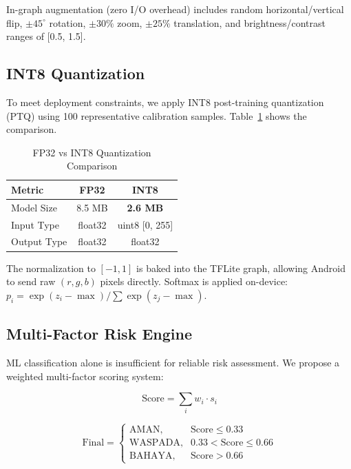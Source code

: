 \documentclass[conference]{IEEEtran}
\begin{document}
In-graph augmentation (zero I/O overhead) includes random horizontal/vertical flip, $\pm45^\circ$ rotation, $\pm30\%$ zoom, $\pm25\%$ translation, and brightness/contrast ranges of [0.5, 1.5].

\subsection{INT8 Quantization}

To meet deployment constraints, we apply INT8 post-training quantization (PTQ) using 100 representative calibration samples. Table~\ref{tab:quantization} shows the comparison.

\begin{table}[h]
	\centering
	\caption{FP32 vs INT8 Quantization Comparison}
	\label{tab:quantization}
	\begin{tabular}{lcc}
		\toprule
		Metric      & FP32    & INT8               \\
		\midrule
		Model Size  & 8.5 MB  & \textbf{2.6 MB}    \\
		Input Type  & float32 & uint8 {[}0, 255{]} \\
		Output Type & float32 & float32            \\
		\bottomrule
	\end{tabular}
\end{table}

The normalization to $[-1, 1]$ is baked into the TFLite graph, allowing Android to send raw $(r, g, b)$ pixels directly. Softmax is applied on-device: $p_i = \exp(z_i - \max) / \sum\exp(z_j - \max)$.

\subsection{Multi-Factor Risk Engine}

ML classification alone is insufficient for reliable risk assessment. We propose a weighted multi-factor scoring system:

\begin{equation}
	\text{Score} = \sum_{i} w_i \cdot s_i
\end{equation}

\begin{equation}
	\text{Final} =
	\begin{cases}
		\text{AMAN},    & \text{Score} \leq 0.33        \\
		\text{WASPADA}, & 0.33 < \text{Score} \leq 0.66 \\
		\text{BAHAYA},  & \text{Score} > 0.66
	\end{cases}
\end{equation}
\end{document}

